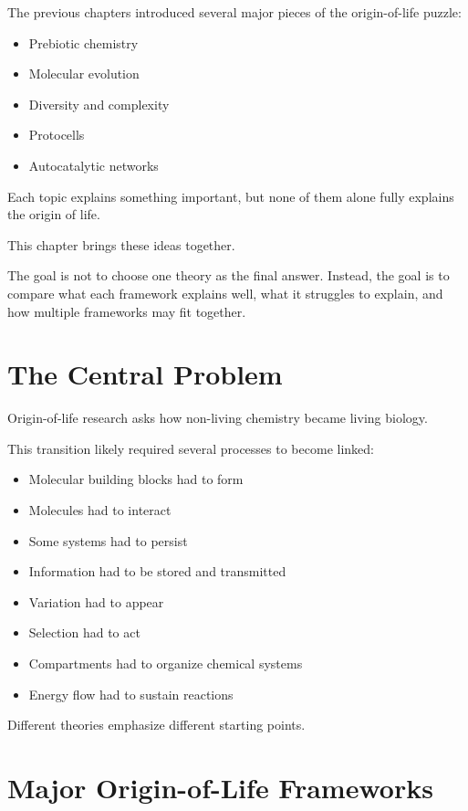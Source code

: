 \documentclass[
  oneside,
  openany]{book}
\providecommand{\tightlist}{%
  \setlength{\itemsep}{0pt}\setlength{\parskip}{0pt}}
\begin{document}
The previous chapters introduced several major pieces of the origin-of-life puzzle:

\begin{itemize}
\tightlist
\item
  Prebiotic chemistry
\item
  Molecular evolution
\item
  Diversity and complexity
\item
  Protocells
\item
  Autocatalytic networks
\end{itemize}

Each topic explains something important, but none of them alone fully explains the origin of life.

This chapter brings these ideas together.

The goal is not to choose one theory as the final answer. Instead, the goal is to compare what each framework explains well, what it struggles to explain, and how multiple frameworks may fit together.

\section{The Central Problem}\label{the-central-problem}

Origin-of-life research asks how non-living chemistry became living biology.

This transition likely required several processes to become linked:

\begin{itemize}
\tightlist
\item
  Molecular building blocks had to form
\item
  Molecules had to interact
\item
  Some systems had to persist
\item
  Information had to be stored and transmitted
\item
  Variation had to appear
\item
  Selection had to act
\item
  Compartments had to organize chemical systems
\item
  Energy flow had to sustain reactions
\end{itemize}

Different theories emphasize different starting points.

\section{Major Origin-of-Life Frameworks}\label{major-origin-of-life-frameworks}
\end{document}

